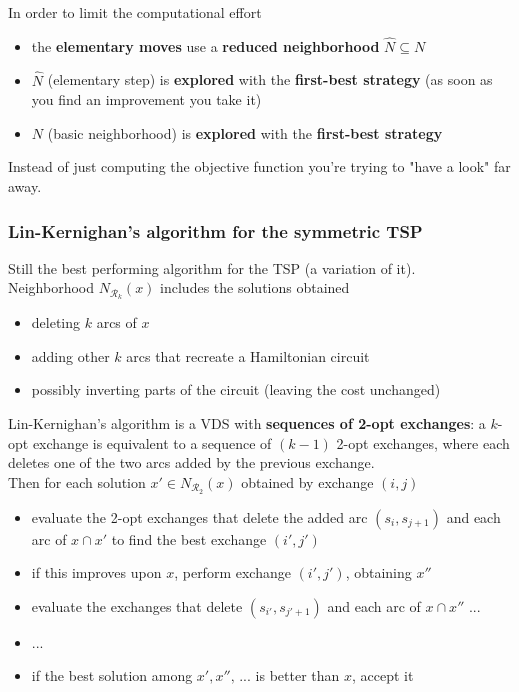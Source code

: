 In order to limit the computational effort
\begin{itemize}
	\item the \textbf{elementary moves} use a \textbf{reduced neighborhood} $\hat{N} \subseteq N$
	
	\item $\hat{N}$ (elementary step) is \textbf{explored} with the \textbf{first-best strategy} (as soon as you find an improvement you take it)
	
	\item $N$ (basic neighborhood) is \textbf{explored} with the \textbf{first-best strategy}
\end{itemize}

Instead of just computing the objective function you're trying to "have a look" far away.\\

\newpage

\subsubsection{Lin-Kernighan's algorithm for the symmetric TSP}
Still the best performing algorithm for the TSP (a variation of it).\\

Neighborhood $N_{\mathcal{R}_k} (x)$ includes the solutions obtained
\begin{itemize}
	\item deleting $k$ arcs of $x$
	
	\item adding other $k$ arcs that recreate a Hamiltonian circuit
	
	\item possibly inverting parts of the circuit (leaving the cost unchanged)
\end{itemize}

Lin-Kernighan's algorithm is a VDS with \textbf{sequences of 2-opt exchanges}: a $k$-opt exchange is equivalent to a sequence of $(k - 1)$ 2-opt exchanges, where each deletes one of the two arcs added by the previous exchange.\\

Then for each solution $x' \in N_{\mathcal{R}_2} (x)$ obtained by exchange $(i, j)$
\begin{itemize}
	\item evaluate the 2-opt exchanges that delete the added arc $(s_i , s_{j+1})$ and each arc of $x \cap x'$ to find the best exchange $(i', j')$
	
	\item if this improves upon $x$, perform exchange $(i', j')$, obtaining $x''$
	
	\item evaluate the exchanges that delete $(s_{i'}, s_{j'+1})$ and each arc of $x \cap x''$ ...
	
	\item ...
	
	\item if the best solution among $x', x'', \, ...$ is better than $x$, accept it
\end{itemize}

